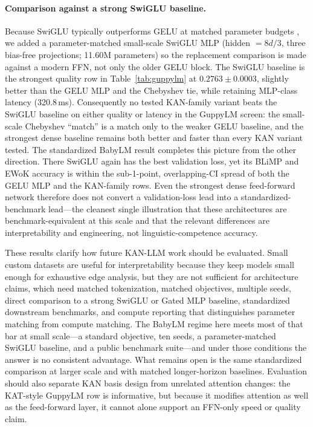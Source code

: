 \documentclass[11pt]{article}
\begin{document}
\paragraph{Comparison against a strong SwiGLU baseline.}
Because SwiGLU typically outperforms GELU at matched parameter budgets \cite{chowdhery2022palm}, we added a parameter-matched small-scale SwiGLU MLP (hidden \(=8d/3\), three bias-free projections; 11.60M parameters) so the replacement comparison is made against a modern FFN, not only the older GELU block. The SwiGLU baseline is the strongest quality row in Table~\ref{tab:guppylm} at \(0.2763\pm0.0003\), slightly better than the GELU MLP and the Chebyshev tie, while retaining MLP-class latency (320.8\,ms). Consequently no tested KAN-family variant beats the SwiGLU baseline on either quality or latency in the GuppyLM screen: the small-scale Chebyshev ``match'' is a match only to the weaker GELU baseline, and the strongest dense baseline remains both better and faster than every KAN variant tested. The standardized BabyLM result completes this picture from the other direction. There SwiGLU again has the best validation loss, yet its BLiMP and EWoK accuracy is within the sub-1-point, overlapping-CI spread of both the GELU MLP and the KAN-family rows. Even the strongest dense feed-forward network therefore does not convert a validation-loss lead into a standardized-benchmark lead---the cleanest single illustration that these architectures are benchmark-equivalent at this scale and that the relevant differences are interpretability and engineering, not linguistic-competence accuracy.

These results clarify how future KAN-LLM work should be evaluated. Small custom datasets are useful for interpretability because they keep models small enough for exhaustive edge analysis, but they are not sufficient for architecture claims, which need matched tokenization, matched objectives, multiple seeds, direct comparison to a strong SwiGLU or Gated MLP baseline, standardized downstream benchmarks, and compute reporting that distinguishes parameter matching from compute matching. The BabyLM regime here meets most of that bar at small scale---a standard objective, ten seeds, a parameter-matched SwiGLU baseline, and a public benchmark suite---and under those conditions the answer is no consistent advantage. What remains open is the same standardized comparison at larger scale and with matched longer-horizon baselines. Evaluation should also separate KAN basis design from unrelated attention changes: the KAT-style GuppyLM row is informative, but because it modifies attention as well as the feed-forward layer, it cannot alone support an FFN-only speed or quality claim.
\end{document}
